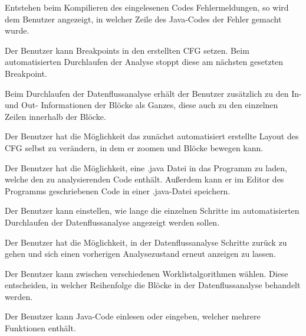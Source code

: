 Entstehen beim Kompilieren des eingelesenen Codes Fehlermeldungen, so wird dem Benutzer angezeigt, in welcher Zeile des Java-Codes der Fehler gemacht wurde.

Der Benutzer kann Breakpoints in den erstellten CFG setzen. Beim automatisierten Durchlaufen der Analyse stoppt diese am nächsten gesetzten Breakpoint.

Beim Durchlaufen der Datenflussanalyse erhält der Benutzer zusätzlich zu den In- und Out-
Informationen der Blöcke als Ganzes, diese auch zu den einzelnen Zeilen
innerhalb der Blöcke.

Der Benutzer hat die Möglichkeit das zunächst automatisiert erstellte Layout des
CFG selbst zu verändern, in dem er zoomen und Blöcke bewegen kann.

Der Benutzer hat die Möglichkeit, eine .java Datei in das Programm zu laden, welche
den zu analysierenden Code enthält. Außerdem kann er im Editor des Programms geschriebenen Code in einer .java-Datei speichern.

Der Benutzer kann einstellen, wie lange die einzelnen Schritte im automatisierten
Durchlaufen der Datenflussanalyse angezeigt werden sollen.

Der Benutzer hat die Möglichkeit, in der Datenflussanalyse Schritte zurück zu gehen
und sich einen vorherigen Analysezustand erneut anzeigen zu lassen.

Der Benutzer kann zwischen verschiedenen Worklistalgorithmen wählen. Diese
entscheiden, in welcher Reihenfolge die Blöcke in der Datenflussanalyse behandelt
werden.

Der Benutzer kann Java-Code einlesen oder eingeben, welcher mehrere Funktionen
enthält.

